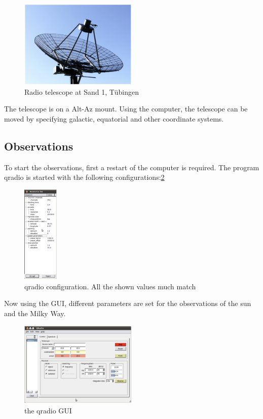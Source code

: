 \documentclass[12pt,a4paper]{article}
\begin{document}
        \begin{figure}[H]
            \centering
            \includegraphics[width=0.5\textwidth]{telescope.png}
            \caption{Radio telescope at Sand 1, Tübingen}
            \label{fig:telescope}
        \end{figure}

        The telescope is on a Alt-Az mount. Using the computer, the telescope can be moved by specifying galactic, equatorial and other coordinate systems.
    \subsection{Observations}
        \label{sec:observations}
            To start the observations, first a restart of the computer is required. The program qradio is started with the following configurations:\ref{fig:qradio_config}
            \begin{figure}[H]
                \centering
                \includegraphics[width=0.15\textwidth]{qradio_config.png}
                \caption{qradio configuration. All the shown values much match}
                \label{fig:qradio_config}
            \end{figure} 

            Now using the GUI, different parameters are set for the observations of the sun and the Milky Way.

            \begin{figure}[H]
                \centering
                \includegraphics[width=0.5\textwidth]{qradio_gui.png}
                \caption{the qradio GUI}
                \label{fig:qradio_gui}
            \end{figure}
\end{document}
